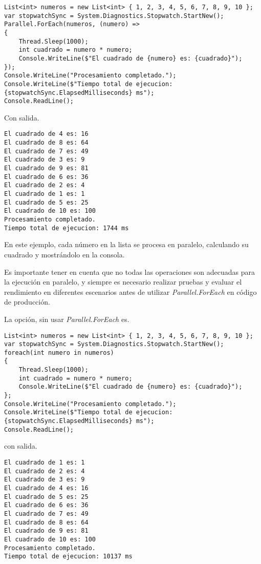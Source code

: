 \documentclass[executivepaper]{article}
\begin{document}
\begin{lstlisting}
List<int> numeros = new List<int> { 1, 2, 3, 4, 5, 6, 7, 8, 9, 10 };
var stopwatchSync = System.Diagnostics.Stopwatch.StartNew();
Parallel.ForEach(numeros, (numero) =>
{
    Thread.Sleep(1000);
    int cuadrado = numero * numero;
    Console.WriteLine($"El cuadrado de {numero} es: {cuadrado}");
});
Console.WriteLine("Procesamiento completado.");
Console.WriteLine($"Tiempo total de ejecucion: {stopwatchSync.ElapsedMilliseconds} ms");
Console.ReadLine();
\end{lstlisting}

Con salida.

\begin{verbatim}
El cuadrado de 4 es: 16
El cuadrado de 8 es: 64
El cuadrado de 7 es: 49
El cuadrado de 3 es: 9
El cuadrado de 9 es: 81
El cuadrado de 6 es: 36
El cuadrado de 2 es: 4
El cuadrado de 1 es: 1
El cuadrado de 5 es: 25
El cuadrado de 10 es: 100
Procesamiento completado.
Tiempo total de ejecucion: 1744 ms
\end{verbatim}

En este ejemplo, cada número en la lista se procesa en paralelo, calculando su cuadrado y mostrándolo en la consola.

Es importante tener en cuenta que no todas las operaciones son adecuadas para la ejecución en paralelo, y siempre es necesario realizar pruebas y evaluar el rendimiento en diferentes escenarios antes de utilizar \emph{Parallel.ForEach} en código de producción.

La opción, sin usar \emph{Parallel.ForEach} es.

\begin{lstlisting}
List<int> numeros = new List<int> { 1, 2, 3, 4, 5, 6, 7, 8, 9, 10 };
var stopwatchSync = System.Diagnostics.Stopwatch.StartNew();
foreach(int numero in numeros)
{
    Thread.Sleep(1000);
    int cuadrado = numero * numero;
    Console.WriteLine($"El cuadrado de {numero} es: {cuadrado}");
};
Console.WriteLine("Procesamiento completado.");
Console.WriteLine($"Tiempo total de ejecucion: {stopwatchSync.ElapsedMilliseconds} ms");
Console.ReadLine();
\end{lstlisting}

con salida.

\begin{verbatim}
El cuadrado de 1 es: 1
El cuadrado de 2 es: 4
El cuadrado de 3 es: 9
El cuadrado de 4 es: 16
El cuadrado de 5 es: 25
El cuadrado de 6 es: 36
El cuadrado de 7 es: 49
El cuadrado de 8 es: 64
El cuadrado de 9 es: 81
El cuadrado de 10 es: 100
Procesamiento completado.
Tiempo total de ejecucion: 10137 ms
\end{verbatim}
\end{document}
